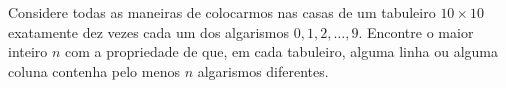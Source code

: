 Considere todas as maneiras de colocarmos nas casas de um tabuleiro $10\times10$ exatamente dez
vezes cada um dos algarismos $0, 1, 2, \dots, 9$.
Encontre o maior inteiro $n$ com a propriedade de que, em cada tabuleiro, alguma linha ou alguma coluna contenha pelo menos $n$ algarismos diferentes.